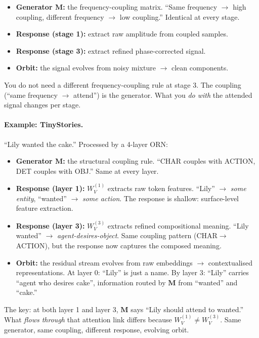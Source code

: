 \documentclass[11pt, a4paper]{article}
\newcommand{\M}{\mathbf{M}}
\theoremstyle{remark}
\begin{document}
\begin{itemize}[nosep]
    \item \textbf{Generator $\M$:} the frequency-coupling matrix.
          ``Same frequency $\to$ high coupling, different frequency $\to$ low coupling.''
          Identical at every stage.
    \item \textbf{Response (stage 1):} extract raw amplitude from coupled samples.
    \item \textbf{Response (stage 3):} extract refined phase-corrected signal.
    \item \textbf{Orbit:} the signal evolves from noisy mixture $\to$ clean components.
\end{itemize}
You do not need a different frequency-coupling rule at stage 3.
The coupling (``same frequency $\to$ attend'') is the generator.
What you \emph{do with} the attended signal changes per stage.

\paragraph{Example: TinyStories.}
``Lily wanted the cake.'' Processed by a 4-layer ORN:

\begin{itemize}[nosep]
    \item \textbf{Generator $\M$:} the structural coupling rule.
          ``CHAR couples with ACTION, DET couples with OBJ.''
          Same at every layer.
    \item \textbf{Response (layer 1):} $W_V^{(1)}$ extracts raw token features.
          ``Lily'' $\to$ \emph{some entity}, ``wanted'' $\to$ \emph{some action}.
          The response is shallow: surface-level feature extraction.
    \item \textbf{Response (layer 3):} $W_V^{(3)}$ extracts refined compositional meaning.
          ``Lily wanted'' $\to$ \emph{agent-desires-object}.
          Same coupling pattern (CHAR$\to$ACTION), but the response now captures the composed meaning.
    \item \textbf{Orbit:} the residual stream evolves from raw embeddings $\to$ contextualised representations.
          At layer 0: ``Lily'' is just a name.
          By layer 3: ``Lily'' carries ``agent who desires cake'', information routed by $\M$ from ``wanted'' and ``cake.''
\end{itemize}

The key: at both layer 1 and layer 3, $\M$ says ``Lily should attend to wanted.''
What \emph{flows through} that attention link differs because $W_V^{(1)} \neq W_V^{(3)}$.
Same generator, same coupling, different response, evolving orbit.
\end{document}
